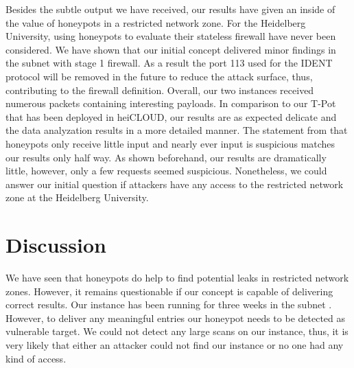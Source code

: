 Besides the subtle output we have received, our results have given an inside of the value of honeypots in a restricted network zone.
For the Heidelberg University, using honeypots to evaluate their stateless firewall have never been considered.
We have shown that our initial concept delivered minor findings in the subnet  with stage 1 firewall.
As a result the port 113 used for the IDENT protocol will be removed in the future to reduce the attack surface, thus, contributing to the firewall definition.
Overall, our two instances received numerous packets containing interesting payloads.
In comparison to our T-Pot that has been deployed in heiCLOUD, our results are as expected delicate and the data analyzation results in a more detailed manner.
The statement from \citet{Spitzner2003} that honeypots only receive little input and nearly ever input is suspicious matches our results only half way.
As shown beforehand, our results are dramatically little, however, only a few requests seemed suspicious.
Nonetheless, we could answer our initial question if attackers have any access to the restricted network zone at the Heidelberg University.

\section{Discussion}

We have seen that honeypots do help to find potential leaks in restricted network zones.
However, it remains questionable if our concept is capable of delivering correct results.
Our instance has been running for three weeks in the subnet .
However, to deliver any meaningful entries our honeypot needs to be detected as vulnerable target.
We could not detect any large scans on our instance, thus, it is very likely that either an attacker could not find our instance or no one had any kind of access.
